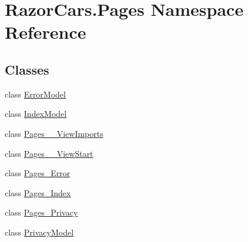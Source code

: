 \hypertarget{namespace_razor_cars_1_1_pages}{}\section{Razor\+Cars.\+Pages Namespace Reference}
\label{namespace_razor_cars_1_1_pages}
\subsection*{Classes}
\begin{DoxyCompactItemize}
\item 
class \mbox{\hyperlink{class_razor_cars_1_1_pages_1_1_error_model}{Error\+Model}}
\item 
class \mbox{\hyperlink{class_razor_cars_1_1_pages_1_1_index_model}{Index\+Model}}
\item 
class \mbox{\hyperlink{class_razor_cars_1_1_pages_1_1_pages_____view_imports}{Pages\+\_\+\+\_\+\+View\+Imports}}
\item 
class \mbox{\hyperlink{class_razor_cars_1_1_pages_1_1_pages_____view_start}{Pages\+\_\+\+\_\+\+View\+Start}}
\item 
class \mbox{\hyperlink{class_razor_cars_1_1_pages_1_1_pages___error}{Pages\+\_\+\+Error}}
\item 
class \mbox{\hyperlink{class_razor_cars_1_1_pages_1_1_pages___index}{Pages\+\_\+\+Index}}
\item 
class \mbox{\hyperlink{class_razor_cars_1_1_pages_1_1_pages___privacy}{Pages\+\_\+\+Privacy}}
\item 
class \mbox{\hyperlink{class_razor_cars_1_1_pages_1_1_privacy_model}{Privacy\+Model}}
\end{DoxyCompactItemize}
